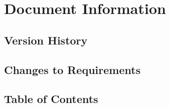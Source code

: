 \documentclass[a4paper,12pt,twoside]{article}
\begin{document}

\setcounter{section}{-1}
\section{Document Information}
\subsection{Version History}
\lipsum[1-2]
\subsection{Changes to Requirements}
\lipsum[3-5]
\newpage
\subsection{Table of Contents}
\tableofcontents
\newpage

\newpage

%
%
\end{document}
